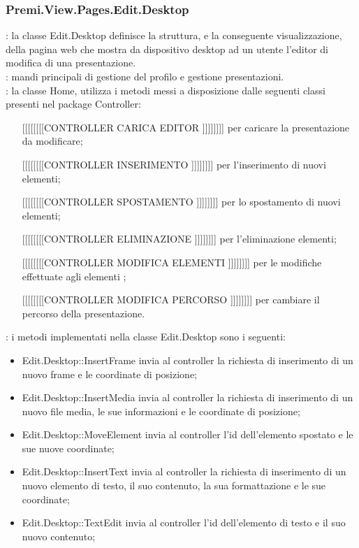 {		\subsubsection{Premi.View.Pages.Edit.Desktop}{
			\textbf{\tipo}: la classe Edit.Desktop definisce la struttura, e la conseguente visualizzazione, della pagina web che mostra da dispositivo desktop ad un utente  l'editor di modifica di una presentazione.\\
			\textbf{\relaz}: mandi principali di gestione del profilo e gestione presentazioni.\\	
			\textbf{\relaz}: la classe Home, utilizza i metodi messi a disposizione dalle seguenti classi presenti nel package Controller:
			\begin{itemize}
				\item [[[[[[[[[CONTROLLER CARICA EDITOR]]]]]]]]] per caricare la presentazione da modificare;
				\item [[[[[[[[[CONTROLLER INSERIMENTO]]]]]]]]] per l'inserimento di nuovi elementi;
				\item [[[[[[[[[CONTROLLER SPOSTAMENTO]]]]]]]]] per lo spostamento di nuovi elementi;
				\item [[[[[[[[[CONTROLLER ELIMINAZIONE]]]]]]]]] per l'eliminazione elementi;
				\item [[[[[[[[[CONTROLLER MODIFICA ELEMENTI]]]]]]]]] per le modifiche  effettuate agli elementi ;
				\item [[[[[[[[[CONTROLLER MODIFICA PERCORSO]]]]]]]]] per cambiare il percorso della presentazione.
			\end{itemize}
			\textbf{\interfacce}: i metodi implementati nella classe Edit.Desktop sono i seguenti:
			\begin{itemize}
				\item Edit.Desktop::InsertFrame invia al controller la richiesta di inserimento di un nuovo frame e le coordinate di posizione;
				\item Edit.Desktop::InsertMedia invia al controller la richiesta di inserimento di un nuovo file media, le sue informazioni e le coordinate di posizione;
				\item Edit.Desktop::MoveElement invia al controller l'id dell'elemento spostato e le sue nuove coordinate;
				\item Edit.Desktop::InsertText invia al controller la richiesta di inserimento di un nuovo elemento di testo, il suo contenuto, la sua formattazione e le sue coordinate;
				\item Edit.Desktop::TextEdit invia al controller l'id dell'elemento di testo e il suo nuovo contenuto;

\end{itemize}}}
